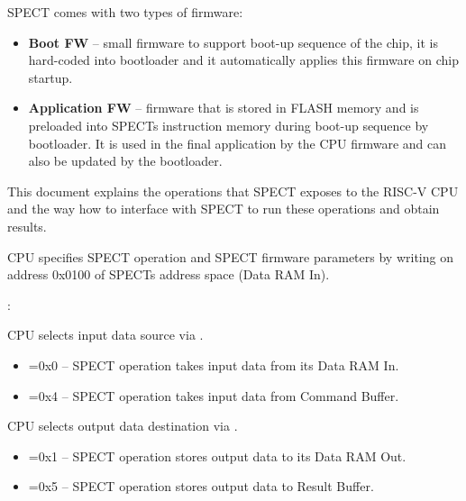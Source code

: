 SPECT comes with two types of firmware:
\begin{itemize}
    \item \textbf{Boot FW} -- small firmware to support boot-up sequence of the chip, it is hard-coded into bootloader and
          it automatically applies this firmware on chip startup.
    \item \textbf{Application FW} -- firmware that is stored in FLASH memory and is preloaded into SPECTs instruction memory during
                                     boot-up sequence by bootloader. It is used in the final application by the CPU firmware and
                                     can also be updated by the bootloader.
\end{itemize}

This document explains the operations that SPECT exposes to the RISC-V CPU and the way how to interface with SPECT
to run these operations and obtain results.

\clearpage
{}

CPU specifies SPECT operation and SPECT firmware parameters by writing\linebreak
{} on address 0x0100 of SPECTs address space (Data RAM In).

\vspace{.3cm}
:



CPU selects input data source via .
\begin{itemize}
    \item {}=0x0 -- SPECT operation takes input data from its Data RAM In.
    \item {}=0x4 -- SPECT operation takes input data from Command Buffer.
\end{itemize}

CPU selects output data destination via .
\begin{itemize}
    \item {}=0x1 -- SPECT operation stores output data to its Data RAM Out.
    \item {}=0x5 -- SPECT operation stores output data to Result Buffer.
\end{itemize}


